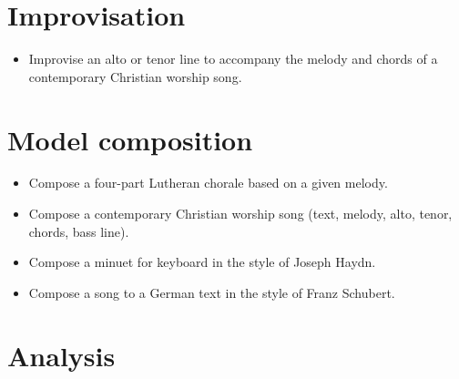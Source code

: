 \section{Improvisation}
\label{improvisation}

\begin{itemize}
\item Improvise an alto or tenor line to accompany the melody and chords of a contemporary Christian worship song.

\end{itemize}

\section{Model composition}
\label{modelcomposition}

\begin{itemize}
\item Compose a four-part Lutheran chorale based on a given melody.

\item Compose a contemporary Christian worship song (text, melody, alto, tenor, chords, bass line).

\item Compose a minuet for keyboard in the style of Joseph Haydn.

\item Compose a song to a German text in the style of Franz Schubert.

\end{itemize}

\section{Analysis}
\label{analysis}

